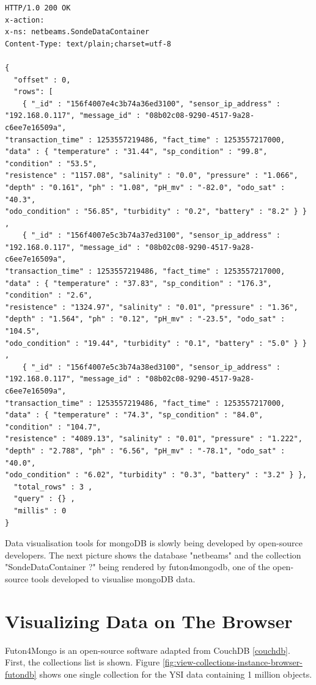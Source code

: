 \lstset{label=cmd:mongo-rest-request,caption=REST HTTP GET Request Example}
\begin{lstlisting}
HTTP/1.0 200 OK
x-action:
x-ns: netbeams.SondeDataContainer
Content-Type: text/plain;charset=utf-8

{
  "offset" : 0,
  "rows": [
    { "_id" : "156f4007e4c3b74a36ed3100", "sensor_ip_address" : "192.168.0.117", "message_id" : "08b02c08-9290-4517-9a28-c6ee7e16509a",
"transaction_time" : 1253557219486, "fact_time" : 1253557217000, "data" : { "temperature" : "31.44", "sp_condition" : "99.8", "condition" : "53.5",
"resistence" : "1157.08", "salinity" : "0.0", "pressure" : "1.066", "depth" : "0.161", "ph" : "1.08", "pH_mv" : "-82.0", "odo_sat" : "40.3",
"odo_condition" : "56.85", "turbidity" : "0.2", "battery" : "8.2" } } ,
    { "_id" : "156f4007e5c3b74a37ed3100", "sensor_ip_address" : "192.168.0.117", "message_id" : "08b02c08-9290-4517-9a28-c6ee7e16509a",
"transaction_time" : 1253557219486, "fact_time" : 1253557217000, "data" : { "temperature" : "37.83", "sp_condition" : "176.3", "condition" : "2.6",
"resistence" : "1324.97", "salinity" : "0.01", "pressure" : "1.36", "depth" : "1.564", "ph" : "0.12", "pH_mv" : "-23.5", "odo_sat" : "104.5",
"odo_condition" : "19.44", "turbidity" : "0.1", "battery" : "5.0" } } ,
    { "_id" : "156f4007e5c3b74a38ed3100", "sensor_ip_address" : "192.168.0.117", "message_id" : "08b02c08-9290-4517-9a28-c6ee7e16509a",
"transaction_time" : 1253557219486, "fact_time" : 1253557217000, "data" : { "temperature" : "74.3", "sp_condition" : "84.0", "condition" : "104.7",
"resistence" : "4089.13", "salinity" : "0.01", "pressure" : "1.222", "depth" : "2.788", "ph" : "6.56", "pH_mv" : "-78.1", "odo_sat" : "40.0",
"odo_condition" : "6.02", "turbidity" : "0.3", "battery" : "3.2" } },
  "total_rows" : 3 ,
  "query" : {} ,
  "millis" : 0
}
\end{lstlisting}

Data visualisation tools for mongoDB is slowly being developed by open-source
developers. The next picture shows the database "netbeams" and the collection
"SondeDataContainer  ?" being rendered by futon4mongodb, one of the
open-source tools developed to visualise mongoDB data.

\section{Visualizing Data on The Browser}

Futon4Mongo is an open-source software adapted from CouchDB \ref{couchdb}.
First, the collections list is shown. Figure
\ref{fig:view-collections-instance-browser-futondb} shows one single collection
for the YSI data containing 1 million objects.

